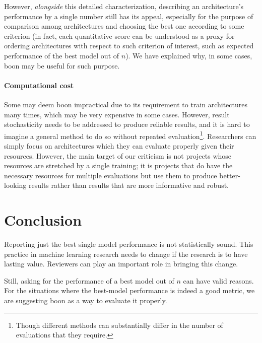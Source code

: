 \documentclass{article}
\newcommand{\tboon}{\gls{boon}\xspace}
\begin{document}
However, \emph{alongside} this detailed characterization, describing an architecture's performance by a single number still has its appeal, especially for the purpose of comparison among architectures and choosing the best one according to some criterion (in fact, each quantitative score can be understood as a proxy for ordering architectures with respect to such criterion of interest, such as expected performance of the best model out of $n$). We have explained why, in some cases, \tboon may be useful for such purpose. 

\paragraph{Computational cost} Some may deem \tboon impractical due to its requirement to train architectures many times, which may be very expensive in some cases. However, result stochasticity needs to be addressed to produce reliable results, and it is hard to imagine a general method to do so without repeated evaluation\footnote{Though different methods can substantially differ in the number of evaluations that they require.}. Researchers can simply focus on architectures which they can evaluate properly given their resources. However, the main target of our criticism is not projects whose resources are stretched by a single training; it is projects that do have the necessary resources for multiple evaluations but use them to produce better-looking results rather than results that are more informative and robust.


\section{Conclusion}
Reporting just the best single model performance is not statistically sound. This practice in machine learning research needs to change if the research is to have lasting value. Reviewers can play an important role in bringing this change.

Still, asking for the performance of a best model out of $n$ can have valid reasons. For the situations where the best-model performance is indeed a good metric, we are suggesting \tboon as a way to evaluate it properly. 

\vskip 0.1in
\end{document}
